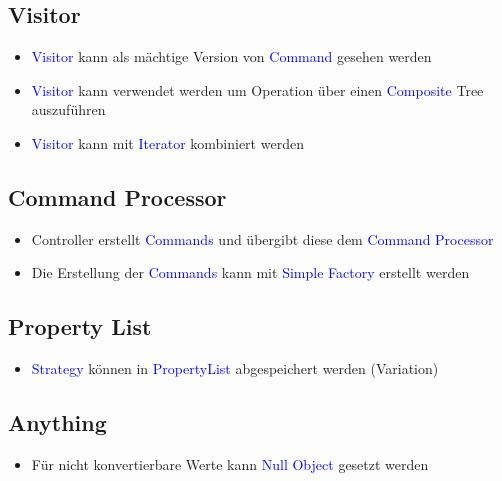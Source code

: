 \subsection{Visitor}

\begin{itemize}
    \item \textcolor{blue}{Visitor} kann als mächtige Version von \textcolor{blue}{Command} gesehen werden
    \item \textcolor{blue}{Visitor} kann verwendet werden um Operation über einen \textcolor{blue}{Composite} Tree auszuführen
    \item \textcolor{blue}{Visitor} kann mit \textcolor{blue}{Iterator} kombiniert werden
\end{itemize}

\subsection{Command Processor}

\begin{itemize}
    \item Controller erstellt \textcolor{blue}{Commands} und übergibt diese dem \textcolor{blue}{Command Processor}
    \item Die Erstellung der \textcolor{blue}{Commands} kann mit \textcolor{blue}{Simple Factory} erstellt werden
\end{itemize}

\subsection{Property List}

\begin{itemize}
    \item \textcolor{blue}{Strategy} können in \textcolor{blue}{PropertyList} abgespeichert werden (Variation)
\end{itemize}

\subsection{Anything}

\begin{itemize}
    \item Für nicht konvertierbare Werte kann \textcolor{blue}{Null Object} gesetzt werden
\end{itemize}
